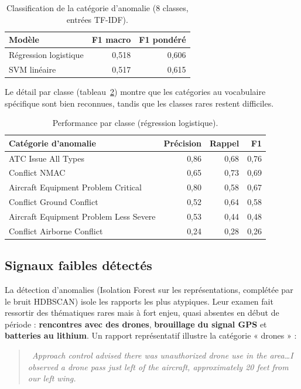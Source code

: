 \documentclass[11pt,a4paper]{article}
\begin{document}
\begin{table}[h]\centering\small
\caption{Classification de la catégorie d'anomalie (8 classes, entrées TF-IDF).}\label{tab:clf}
\begin{tabular}{lrr}
\toprule
\textbf{Modèle} & \textbf{F1 macro} & \textbf{F1 pondéré} \\
\midrule
Régression logistique & 0,518 & 0,606 \\
SVM linéaire & 0,517 & 0,615 \\
\bottomrule
\end{tabular}
\end{table}

Le détail par classe (tableau~\ref{tab:perclass}) montre que les catégories au vocabulaire
spécifique sont bien reconnues, tandis que les classes rares restent difficiles.

\begin{table}[h]\centering\small
\caption{Performance par classe (régression logistique).}\label{tab:perclass}
\begin{tabular}{lrrr}
\toprule
\textbf{Catégorie d'anomalie} & \textbf{Précision} & \textbf{Rappel} & \textbf{F1} \\
\midrule
ATC Issue All Types & 0,86 & 0,68 & 0,76 \\
Conflict NMAC & 0,65 & 0,73 & 0,69 \\
Aircraft Equipment Problem Critical & 0,80 & 0,58 & 0,67 \\
Conflict Ground Conflict & 0,52 & 0,64 & 0,58 \\
Aircraft Equipment Problem Less Severe & 0,53 & 0,44 & 0,48 \\
Conflict Airborne Conflict & 0,24 & 0,28 & 0,26 \\
\bottomrule
\end{tabular}
\end{table}

\subsection{Signaux faibles détectés}
La détection d'anomalies (Isolation Forest sur les représentations, complétée par le bruit
HDBSCAN) isole les rapports les plus atypiques. Leur examen fait ressortir des thématiques
rares mais à fort enjeu, quasi absentes en début de période : \textbf{rencontres avec des
drones}, \textbf{brouillage du signal GPS} et \textbf{batteries au lithium}. Un rapport
représentatif illustre la catégorie « drones » :

\begin{quote}\small\itshape\color{nblue}
\guillemotleft~Approach control advised there was unauthorized drone use in the area\ldots I
observed a drone pass just left of the aircraft, approximately 20 feet from our left
wing.~\guillemotright
\end{quote}
\end{document}
